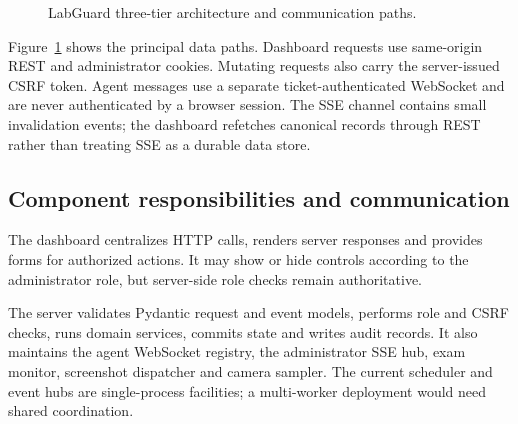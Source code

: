 \documentclass[12pt,a4paper]{report}
\begin{document}
\begin{figure}[H]
\centering
{}
\caption{LabGuard three-tier architecture and communication paths.}
\label{fig:labguard-architecture}
\end{figure}

Figure~\ref{fig:labguard-architecture} shows the principal data paths. Dashboard
requests use same-origin REST and administrator cookies. Mutating requests also
carry the server-issued CSRF token. Agent messages use a separate
ticket-authenticated WebSocket and are never authenticated by a browser
session. The SSE channel contains small invalidation events; the dashboard
refetches canonical records through REST rather than treating SSE as a durable
data store.

\subsection{Component responsibilities and communication}
The dashboard centralizes HTTP calls, renders server responses and provides
forms for authorized actions. It may show or hide controls according to the
administrator role, but server-side role checks remain authoritative.

The server validates Pydantic request and event models, performs role and CSRF
checks, runs domain services, commits state and writes audit records. It also
maintains the agent WebSocket registry, the administrator SSE hub, exam
monitor, screenshot dispatcher and camera sampler. The current scheduler and
event hubs are single-process facilities; a multi-worker deployment would need
shared coordination.
\end{document}
